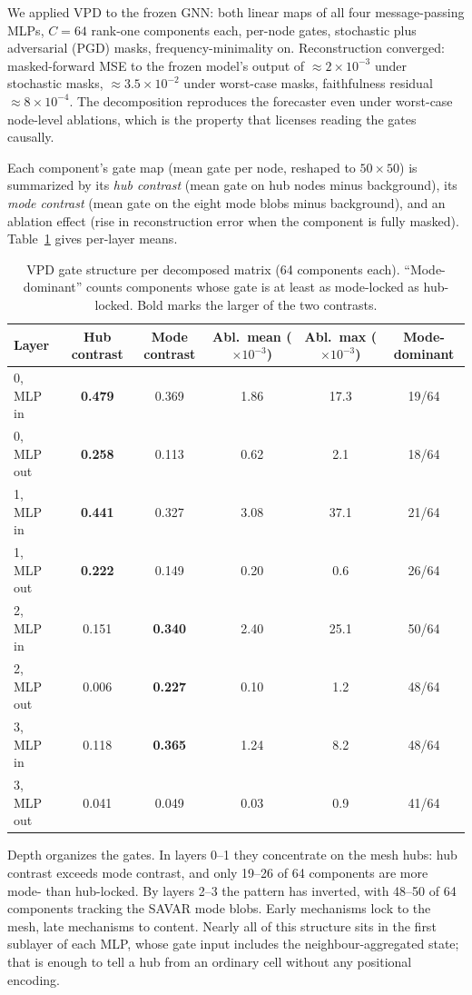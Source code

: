 We applied VPD to the frozen GNN: both linear maps of all four message-passing
MLPs, $C=64$ rank-one components each, per-node gates, stochastic plus adversarial
(PGD) masks, frequency-minimality on. Reconstruction converged: masked-forward
MSE to the frozen model's output of ${\approx}2\times10^{-3}$ under stochastic
masks, ${\approx}3.5\times10^{-2}$ under worst-case masks, faithfulness residual
${\approx}8\times10^{-4}$. The decomposition reproduces the forecaster even under
worst-case node-level ablations, which is the property that licenses reading the
gates causally.

Each component's gate map (mean gate per node, reshaped to $50\times50$) is
summarized by its \emph{hub contrast} (mean gate on hub nodes minus background),
its \emph{mode contrast} (mean gate on the eight mode blobs minus background), and
an ablation effect (rise in reconstruction error when the component is fully
masked). Table~\ref{tab:vpd} gives per-layer means.

\begin{table}[h]
\centering
\small
\begin{tabular}{lccccc}
\toprule
Layer & Hub contrast & Mode contrast & Abl.\ mean ($\times10^{-3}$) &
Abl.\ max ($\times10^{-3}$) & Mode-dominant \\
\midrule
0, MLP in   & \textbf{0.479} & 0.369 & 1.86 & 17.3 & 19/64 \\
0, MLP out  & \textbf{0.258} & 0.113 & 0.62 &  2.1 & 18/64 \\
1, MLP in   & \textbf{0.441} & 0.327 & 3.08 & 37.1 & 21/64 \\
1, MLP out  & \textbf{0.222} & 0.149 & 0.20 &  0.6 & 26/64 \\
2, MLP in   & 0.151 & \textbf{0.340} & 2.40 & 25.1 & 50/64 \\
2, MLP out  & 0.006 & \textbf{0.227} & 0.10 &  1.2 & 48/64 \\
3, MLP in   & 0.118 & \textbf{0.365} & 1.24 &  8.2 & 48/64 \\
3, MLP out  & 0.041 & 0.049 & 0.03 &  0.9 & 41/64 \\
\bottomrule
\end{tabular}
\caption{VPD gate structure per decomposed matrix (64 components each).
``Mode-dominant'' counts components whose gate is at least as mode-locked as
hub-locked. Bold marks the larger of the two contrasts.}
\label{tab:vpd}
\end{table}

Depth organizes the gates. In layers 0--1 they concentrate on the mesh hubs: hub
contrast exceeds mode contrast, and only 19--26 of 64 components are more mode-
than hub-locked. By layers 2--3 the pattern has inverted, with 48--50 of 64
components tracking the SAVAR mode blobs. Early mechanisms lock to the mesh, late
mechanisms to content. Nearly all of this structure sits in the first sublayer of
each MLP, whose gate input includes the neighbour-aggregated state; that is enough
to tell a hub from an ordinary cell without any positional encoding.

